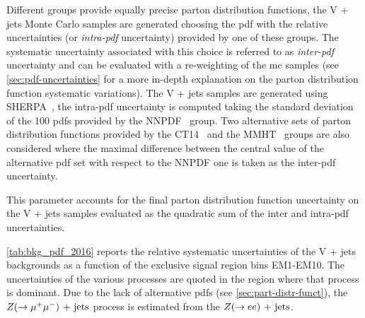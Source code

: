 Different groups provide equally precise parton distribution functions, the V +
jets Monte Carlo samples are generated choosing the \gls{pdf} with the relative
uncertainties (or \emph{intra-\gls{pdf}} uncertainty) provided by one of these
groups. The systematic uncertainty associated with this choice is referred to as
\emph{inter-\gls{pdf}} uncertainty and can be evaluated with a re-weighting of
the \gls{mc} samples (see \cref{sec:pdf-uncertainties} for a more in-depth
explanation on the parton distribution function systematic variations). The V +
jets samples are generated using SHERPA~\cite{SHERPAGenerator}, the
intra-\gls{pdf} uncertainty is computed taking the standard deviation of the 100
\glspl{pdf} provided by the NNPDF~\cite{NNPDF} group. Two alternative sets of
parton distribution functions provided by the CT14~\cite{CT14PDF} and the
MMHT~\cite{MMHT} groups are also considered where the maximal difference between
the central value of the alternative \gls{pdf} set with respect to the NNPDF one
is taken as the inter-\gls{pdf} uncertainty.
\begin{description}[font=\normalfont]
\item[PDFComb:] This parameter accounts for the final parton distribution
  function uncertainty on the V + jets samples evaluated as the quadratic sum of
  the inter and intra-\gls{pdf} uncertainties.
\end{description}
\cref{tab:bkg_pdf_2016} reports the relative systematic uncertainties of the V +
jets backgrounds as a function of the exclusive signal region bins EM1-EM10. The
uncertainties of the various processes are quoted in the region where that
process is dominant. Due to the lack of alternative \glspl{pdf} (see
\cref{sec:part-distr-funct}), the $Z (\rightarrow \mu^+ \mu^-)\mathrm{~+~jets}$ process is estimated from the
$Z (\rightarrow e e)\mathrm{~+~jets}$.
